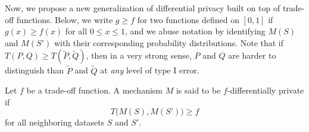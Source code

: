 


Now, we propose a new generalization of differential privacy built on top of trade-off functions. Below, we write $g \ge f$ for two functions defined on $[0, 1]$ if $g(x) \ge f(x)$ for all $0 \le x \le 1$, and we abuse notation by identifying $M(S)$ and $M(S')$ with their corresponding probability distributions. Note that if $T(P,Q) \ge T(\widetilde P, \widetilde Q)$, then in a very strong sense, $P$ and $Q$ are harder to distinguish than $\widetilde P$ and $\widetilde Q$ at \textit{any} level of type I error.

\begin{definition} \label{def:kstable}
Let $f$ be a trade-off function. A mechanism $M$ is said to be $f$-differentially private if
\[
T\big(M(S), M(S')\big) \ge f
\]
for all neighboring datasets $S$ and $S'$.
\end{definition}



